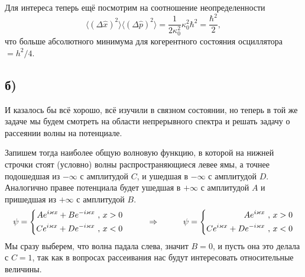Для интереса теперь ещё посмотрим на соотношение неопределенности
\begin{equation*}
	\langle(\Delta \hat{x})^2\rangle\langle(\Delta \hat{p})^2\rangle = \frac{1}{2 \kappa_0^2} \kappa_0^2 \hbar^2 = \frac{\hbar^2}{2},
\end{equation*}
что больше абсолютного минимума для когерентного состояния осциллятора $ = h^2/4$.

\subsection*{б)}
И казалось бы всё хорошо, всё изучили в связном состоянии, но теперь в той же задаче мы будем смотреть на области непрерывного спектра и решать задачу о рассеянии волны на потенциале.

Запишем тогда наиболее общую волновую функцию, в которой на нижней строчки стоят (условно) волны распространяющиеся левее ямы, а точнее подошедшая из $-\infty$ с амплитудой $C$, и ушедшая в $-\infty$ с амплитудой $D$. Аналогично правее потенциала будет ушедшая в $+\infty$ с амплитудой $A$ и пришедшая из $+\infty$ с амплитудой $B$.
\begin{equation*}
	\psi = \left\{\begin{aligned}
		A e^{i \kappa x} + B e^{- i \kappa x} \ , \ & x >0\\
		C e^{i \kappa x} + D e^{- i \kappa x} \ , \ & x <0
	\end{aligned}\right.
	\hspace{1 cm}
	\Rightarrow
	\hspace{1 cm}
	\psi = \left\{\begin{aligned}
		A e^{i \kappa x}  \ , \ & x >0\\
		C e^{i \kappa x} + D e^{- i \kappa x} \ , \ & x <0
	\end{aligned}\right.
\end{equation*}
Мы сразу выберем, что волна падала слева, значит $B = 0$, и пусть она это делала с $C = 1$, так как в вопросах рассеивания нас будут интересовать относительные величины.

